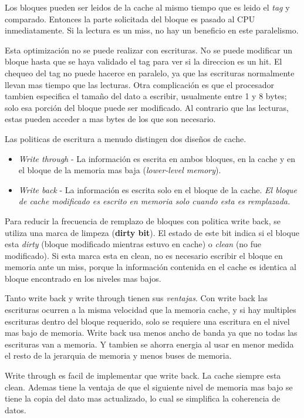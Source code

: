 \documentclass{article}
\begin{document}
Los bloques pueden ser leidos de la cache al mismo tiempo que es leido el \textit{tag} y comparado. Entonces la parte solicitada del bloque es pasado al CPU inmediatamente.
Si la lectura es un miss, no hay un beneficio en este paralelismo.

Esta optimización no se puede realizar con escrituras. No se puede modificar un bloque hasta que se haya validado el tag para ver si la direccion es un hit. El chequeo del tag no puede hacerce en paralelo, ya que las escrituras normalmente llevan mas tiempo que las lecturas.
Otra complicación es que el procesador tambien especifica el tamaño del dato a escribir, usualmente entre 1 y 8 bytes; solo esa porción del bloque puede ser modificado. Al contrario que las lecturas, estas pueden acceder a mas bytes de los que son necesario.

Las politicas de escritura a menudo distingen dos diseños de cache.

\begin{itemize} 
    \item \textit{Write through} - La información es escrita en ambos bloques, en la cache y en el bloque de la memoria mas baja (\textit{lower-level memory}).
    \item \textit{Write back} - La información es escrita solo en el bloque de la cache. \textit{El bloque de cache modificado es escrito en memoria solo cuando esta es remplazada.}
\end{itemize}

Para reducir la frecuencia de remplazo de bloques con politica write back, se utiliza una marca de limpeza (\textbf{dirty bit}). El estado de este bit indica si el bloque esta \textit{dirty} (bloque modificado mientras estuvo en cache) o \textit{clean} (no fue modificado). Si esta marca esta en clean, no es necesario escribir el bloque en memoria ante un miss, porque la información contenida en el cache es identica al bloque encontrado en los niveles mas bajos.

Tanto write back y write through tienen sus \textit{ventajas}. Con write back las escrituras ocurren a la misma velocidad que la memoria cache, y si hay multiples escrituras dentro del bloque requerido, solo se requiere una escritura en el nivel mas bajo de memoria. Write back usa menos ancho de banda ya que no todas las escrituras van a memoria. Y tambien se ahorra energia al usar en menor medida el resto de la jerarquia de memoria y menos buses de memoria.

Write through es facil de implementar que write back. La cache siempre esta clean. Ademas tiene la ventaja de que el siguiente nivel de memoria mas bajo se tiene la copia del dato mas actualizado, lo cual se simplifica la coherencia de datos.
\end{document}
